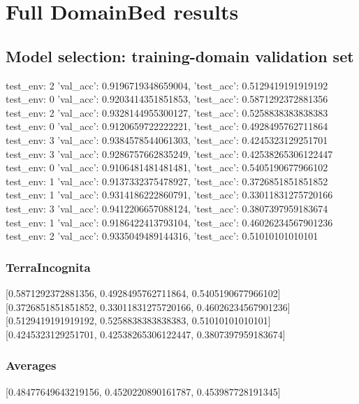 \documentclass{article}
\begin{document}
\section{Full DomainBed results}

\subsection{Model selection: training-domain validation set}
test_env: 2
{'val_acc': 0.9196719348659004, 'test_acc': 0.5129419191919192}
test_env: 0
{'val_acc': 0.9203414351851853, 'test_acc': 0.5871292372881356}
test_env: 2
{'val_acc': 0.9328144955300127, 'test_acc': 0.5258838383838383}
test_env: 0
{'val_acc': 0.9120659722222221, 'test_acc': 0.4928495762711864}
test_env: 3
{'val_acc': 0.9384578544061303, 'test_acc': 0.4245323129251701}
test_env: 3
{'val_acc': 0.9286757662835249, 'test_acc': 0.42538265306122447}
test_env: 0
{'val_acc': 0.9106481481481481, 'test_acc': 0.5405190677966102}
test_env: 1
{'val_acc': 0.9137332375478927, 'test_acc': 0.3726851851851852}
test_env: 1
{'val_acc': 0.9314186222860791, 'test_acc': 0.33011831275720166}
test_env: 3
{'val_acc': 0.9412206657088124, 'test_acc': 0.3807397959183674}
test_env: 1
{'val_acc': 0.9186422413793104, 'test_acc': 0.46026234567901236}
test_env: 2
{'val_acc': 0.9335049489144316, 'test_acc': 0.51010101010101}

\subsubsection{TerraIncognita}
[0.5871292372881356, 0.4928495762711864, 0.5405190677966102]
[0.3726851851851852, 0.33011831275720166, 0.46026234567901236]
[0.5129419191919192, 0.5258838383838383, 0.51010101010101]
[0.4245323129251701, 0.42538265306122447, 0.3807397959183674]

\begin{center}
\end{center}

\subsubsection{Averages}
[0.48477649643219156, 0.4520220890161787, 0.453987728191345]

\begin{center}
\end{center}
\end{document}
